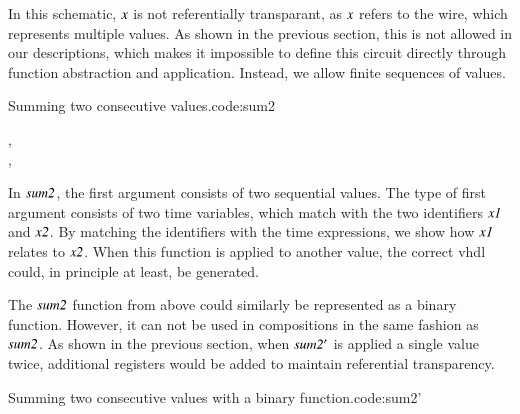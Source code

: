 In this schematic, \ensuremath{\Varid{x}} is not referentially transparant, as \ensuremath{\Varid{x}} refers to the wire, which represents multiple values. 
As shown in the previous section, this is not allowed in our descriptions, which makes it impossible to define this circuit directly through function abstraction and application.
Instead, we allow finite sequences of values.

\begin{texexptitled}{Summing two consecutive values.}{code:sum2}\begin{hscode}\SaveRestoreHook
{}%
%
%
\>[3]{}\mathbin{::}\langle{},\mathbin{+}\rangle\to {}\langle{}\mathbin{+}\rangle{}\<[E]%
\\
\>[3]{}\langle{},\rangle\mathrel{=}\mathbin{+}\<[E]%
\ColumnHook
\end{hscode}\resethooks
\end{texexptitled}

In \ensuremath{\Varid{sum2}}, the first argument consists of two sequential values.
The type of first argument consists of two time variables, which match with the two identifiers \ensuremath{\Varid{x1}} and \ensuremath{\Varid{x2}}. 
By matching the identifiers with the time expressions, we show how \ensuremath{\Varid{x1}} relates to \ensuremath{\Varid{x2}}.
When this function is applied to another value, the correct \gls{vhdl} could, in principle at least, be generated.

The \ensuremath{\Varid{sum2}} function from above could similarly be represented as a binary function.
However, it can not be used in compositions in the same fashion as \ensuremath{\Varid{sum2}}.
As shown in the previous section, when \ensuremath{\Varid{sum2'}} is applied a single value twice, additional registers would be added to maintain referential transparency.

\begin{texexptitled}{Summing two consecutive values with a binary function.}{code:sum2'}\begin{hscode}\SaveRestoreHook
{}%
%
%
\>[3]{}\mathbin{::}\langle{}\rangle\to {}\langle{}\mathbin{+}\rangle\to {}\langle{}\mathbin{+}\rangle{}\<[E]%
\\
\>[3]{}\;\;\mathrel{=}\mathbin{+}\<[E]%
\ColumnHook
\end{hscode}\resethooks
\end{texexptitled}

